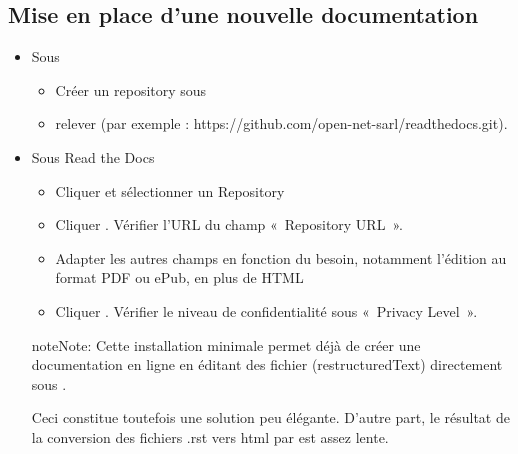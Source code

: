 \documentclass[letterpaper,10pt,french]{sphinxmanual}
\begin{document}
\subsection{Mise en place d’une nouvelle documentation}
\label{\detokenize{readthedocs/maintenance:mise-en-place-d-une-nouvelle-documentation}}\begin{itemize}
\item {} 
Sous {\hyperref[\detokenize{readthedocs/glossary:term-github}]{}}
\begin{itemize}
\item {} 
Créer un repository sous {\hyperref[\detokenize{readthedocs/glossary:term-github}]{}}

\item {} 
relever  (par exemple : https://github.com/open-net-sarl/readthedocs.git).

\end{itemize}

\item {} 
Sous Read the Docs
\begin{itemize}
\item {} 
Cliquer  et sélectionner un Repository

\item {} 
Cliquer . Vérifier l’URL du champ « Repository URL ».

\item {} 
Adapter les autres champs en fonction du besoin, notamment l’édition au format PDF ou ePub, en plus de HTML

\item {} 
Cliquer . Vérifier le niveau de confidentialité sous « Privacy Level ».

\end{itemize}

\begin{sphinxadmonition}{note}{Note:}
Cette installation minimale permet déjà de créer une documentation en ligne en éditant des fichier  (restructuredText) directement sous {\hyperref[\detokenize{readthedocs/glossary:term-github}]{}}.

Ceci constitue toutefois une solution peu élégante. D’autre part, le résultat de la conversion des fichiers .rst vers html par {\hyperref[\detokenize{readthedocs/glossary:term-read-the-docs}]{}} est assez lente.


\end{sphinxadmonition}
\end{itemize}
\end{document}
